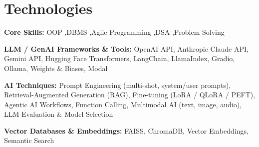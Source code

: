 \section{Technologies}

\begin{onecolentry}
    \textbf{Core Skills:} 
    OOP ,DBMS ,Agile Programming ,DSA ,Problem Solving
\end{onecolentry}

\begin{onecolentry}
    \textbf{LLM / GenAI Frameworks \& Tools:} 
    OpenAI API, Anthropic Claude API, Gemini API, Hugging Face Transformers, LangChain, LlamaIndex, Gradio, Ollama, Weights \& Biases, Modal
\end{onecolentry}

\begin{onecolentry}
    \textbf{AI Techniques:} 
    Prompt Engineering (multi-shot, system/user prompts), Retrieval-Augmented Generation (RAG), Fine-tuning (LoRA / QLoRA / PEFT), Agentic AI Workflows, Function Calling, Multimodal AI (text, image, audio), LLM Evaluation \& Model Selection
\end{onecolentry}

\begin{onecolentry}
    \textbf{Vector Databases \& Embeddings:} 
    FAISS, ChromaDB, Vector Embeddings, Semantic Search
\end{onecolentry}